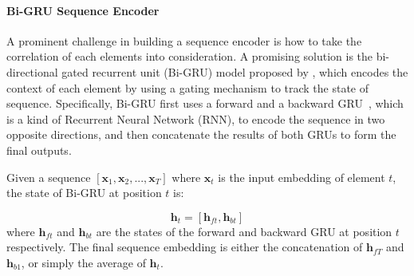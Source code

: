 \paragraph{Bi-GRU Sequence Encoder} 
A prominent challenge in building a sequence encoder is how to take the correlation of each elements into consideration. A promising solution is the bi-directional gated recurrent unit (Bi-GRU) model proposed by \cite{bahdanau2015neural}, which encodes the context of each element by using a gating mechanism to track the state of sequence.
Specifically, Bi-GRU first uses a forward and a backward GRU~\cite{cho2014learning}, which is a kind of Recurrent Neural Network (RNN), to encode the sequence in two opposite directions, and then concatenate the results of both GRUs to form the final outputs. 

Given a sequence $[\mathbf{x}_1, \mathbf{x}_2, ..., \mathbf{x}_T]$ where $\mathbf{x}_t$ is the input embedding of element $t$, the state of Bi-GRU at position $t$ is:

\begin{equation}
\mathbf{h}_t = [\mathbf{h}_{ft}, \mathbf{h}_{bt}]
\end{equation}
where $\mathbf{h}_{ft}$ and $\mathbf{h}_{bt}$ are the states of the forward and backward GRU at position $t$ respectively. The final sequence embedding is either the concatenation of $\mathbf{h}_{fT}$ and $\mathbf{h}_{b1}$, or simply the average of $\mathbf{h}_t$.





